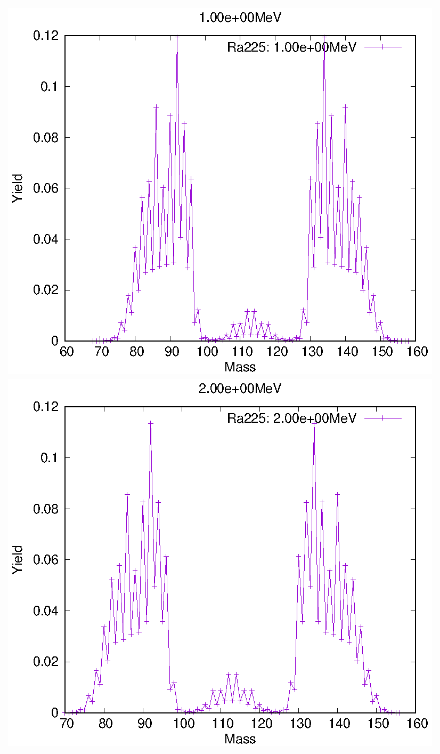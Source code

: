 \begin{figure}[htbp]
 \begin{minipage}{0.33\textwidth} \begin{center} \includegraphics[width=\textwidth]{YA/Ra225_1.00e+00.eps} \end{center} \end{minipage}
\begin{minipage}{0.33\textwidth} \begin{center} \includegraphics[width=\textwidth]{YA/Ra225_2.00e+00.eps} \end{center} \end{minipage}

\end{figure}
